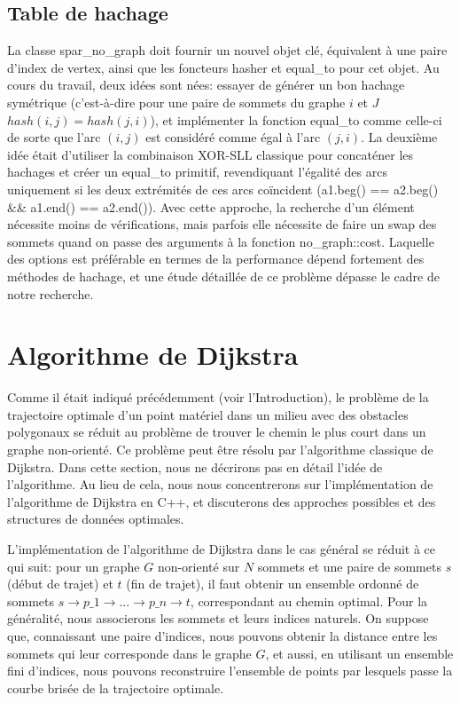 \documentclass[12pt]{article}
\begin{document}
	
	\subsection {Table de hachage}
	La classe spar\_no\_graph doit fournir un nouvel objet clé, équivalent à une paire d'index de vertex, ainsi que les foncteurs hasher et equal\_to pour cet objet. Au cours du travail, deux idées sont nées: essayer de générer un bon hachage symétrique (c'est-à-dire pour une paire de sommets du graphe $i$ et $J$ $hash(i, j) = hash(j, i)$), et implémenter la fonction equal\_to comme celle-ci de sorte que l'arc $(i, j)$ est considéré comme égal à l'arc $(j, i)$. La deuxième idée était d'utiliser la combinaison XOR-SLL classique pour concaténer les hachages et créer un equal\_to primitif, revendiquant l'égalité des arcs uniquement si les deux extrémités de ces arcs coïncident (a1.beg() == a2.beg() \&\& a1.end() == a2.end()). Avec cette approche, la recherche d'un élément nécessite moins de vérifications, mais parfois elle nécessite de faire un swap des sommets quand on passe des arguments à la fonction no\_graph::cost. Laquelle des options est préférable en termes de la performance dépend fortement des méthodes de hachage, et une étude détaillée de ce problème dépasse le cadre de notre recherche.
	
	
	\section{Algorithme de Dijkstra}
	
	Comme il était indiqué précédemment (voir l’Introduction), le problème de la trajectoire optimale d'un point matériel dans un milieu avec des obstacles polygonaux se réduit au problème de trouver le chemin le plus court dans un graphe non-orienté. Ce problème peut être résolu par l'algorithme classique de Dijkstra. Dans cette section, nous ne décrirons pas en détail l'idée de l'algorithme. Au lieu de cela, nous nous concentrerons sur l'implémentation de l'algorithme de Dijkstra en C++, et discuterons des approches possibles et des structures de données optimales.
	
	L'implémentation de l'algorithme de Dijkstra dans le cas général se réduit à ce qui suit: pour un graphe $G$ non-orienté sur $N$ sommets et une paire de sommets $s$ (début de trajet) et $t$ (fin de trajet), il faut obtenir un ensemble ordonné de sommets $s \rightarrow p\_1 \rightarrow ... \rightarrow p\_n \rightarrow t$, correspondant au chemin optimal. Pour la généralité, nous associerons les sommets et leurs indices naturels. On suppose que, connaissant une paire d'indices, nous pouvons obtenir la distance entre les sommets qui leur corresponde dans le graphe $G$, et aussi, en utilisant un ensemble fini d'indices, nous pouvons reconstruire l'ensemble de points par lesquels passe la courbe brisée de la trajectoire optimale.
	
\end{document}
